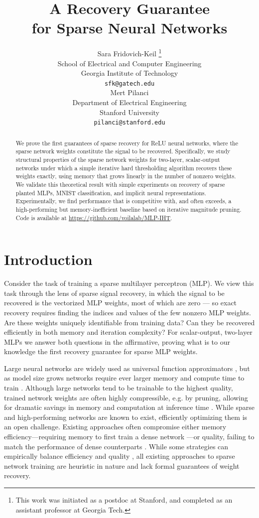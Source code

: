 \documentclass{article} %
\title{A Recovery Guarantee\\for Sparse Neural Networks}
\author{Sara Fridovich-Keil \thanks{This work was initiated as a postdoc at Stanford, and completed as an assistant professor at Georgia Tech.} \\
School of Electrical and Computer Engineering\\
Georgia Institute of Technology\\
\texttt{sfk@gatech.edu} \\
\And
Mert Pilanci \\
Department of Electrical Engineering \\
Stanford University \\
\texttt{pilanci@stanford.edu} 
}
\newcommand{\1}{\ensuremath{{\sf (i)}}}
\newcommand{\2}{\ensuremath{{\sf (ii)}}}
\newcommand{\3}{\ensuremath{{\sf (iii)}}}
\newcommand{\4}{\ensuremath{{\sf (iv)}}}
\newcommand{\5}{\ensuremath{{\sf (v)}}}
\newcommand{\6}{\ensuremath{{\sf (vi)}}}
\begin{document}
\maketitle

\begin{abstract}
We prove the first guarantees of sparse recovery for ReLU neural networks, where the sparse network weights constitute the signal to be recovered. Specifically, we study structural properties of the sparse network weights for two-layer, scalar-output networks under which a simple iterative hard thresholding algorithm recovers these weights exactly, using memory that grows linearly in the number of nonzero weights. We validate this theoretical result with simple experiments on recovery of sparse planted MLPs, MNIST classification, and implicit neural representations. Experimentally, we find performance that is competitive with, and often exceeds, a high-performing but memory-inefficient baseline based on iterative magnitude pruning. Code is available at \url{https://github.com/voilalab/MLP-IHT}.
\end{abstract}

\section{Introduction}
\label{sec:intro}



Consider the task of training a sparse multilayer perceptron (MLP). We view this task through the lens of sparse signal recovery, in which the signal to be recovered is the vectorized MLP weights, most of which are zero --- so exact recovery requires finding the indices and values of the few nonzero MLP weights. Are these weights uniquely identifiable from training data? Can they be recovered efficiently in both memory and iteration complexity? For scalar-output, two-layer MLPs we answer both questions in the affirmative, proving what is to our knowledge the first recovery guarantee for sparse MLP weights.

Large neural networks are widely used as universal function approximators \citep{hornik1989multilayer}, but as model size grows networks require ever larger memory and compute time to train \citep{kaplan2020scaling}. Although large networks tend to be trainable to the highest quality, trained network weights are often highly compressible, e.g. by pruning, allowing for dramatic savings in memory and computation at inference time \citep{cheng2024survey}. While sparse and high-performing networks are known to exist, efficiently optimizing them is an open challenge. Existing approaches often compromise either memory efficiency---requiring memory to first train a dense network \citep{frankle2018lottery, saikumar2024drive, gharatappeh2025information}---or quality, failing to match the performance of dense counterparts \citep{frankle2021pruning, saikumar2024drive}. While some strategies can empirically balance efficiency and quality \citep{parger2022gradient, jin2016training, damadi2024learning}, all existing approaches to sparse network training are heuristic in nature and lack formal guarantees of weight recovery.
\end{document}
